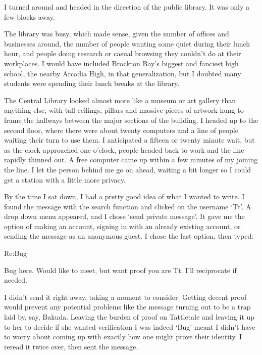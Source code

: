I turned around and headed in the direction of the public library.  It was only a few blocks away.



The library was busy, which made sense, given the number of offices and businesses around, the number of people wanting some quiet during their lunch hour, and people doing research or casual browsing they couldn't do at their workplaces.  I would have included Brockton Bay's biggest and fanciest high school, the nearby Arcadia High, in that generalization, but I doubted many students were spending their lunch breaks at the library.



The Central Library looked almost more like a museum or art gallery than anything else, with tall ceilings, pillars and massive pieces of artwork hung to frame the hallways between the major sections of the building.  I headed up to the second floor, where there were about twenty computers and a line of people waiting their turn to use them.  I anticipated a fifteen or twenty minute wait, but as the clock approached one o'clock, people headed back to work and the line rapidly thinned out.  A free computer came up within a few minutes of my joining the line. I let the person behind me go on ahead, waiting a bit longer so I could get a station with a little more privacy.



By the time I sat down, I had a pretty good idea of what I wanted to write.  I found the message with the search function and clicked on the username `Tt'.  A drop down menu appeared, and I chose `send private message'.  It gave me the option of making an account, signing in with an already existing account, or sending the message as an anonymous guest.  I chose the last option, then typed:



Re:Bug



Bug here.  Would like to meet, but want proof you are Tt.  I'll reciprocate if needed.



I didn't send it right away, taking a moment to consider.  Getting decent proof would prevent any potential problems like the message turning out to be a trap laid by, say, Bakuda.  Leaving the burden of proof on Tattletale and leaving it up to her to decide if she wanted verification I was indeed `Bug' meant I didn't have to worry about coming up with exactly how one might prove their identity.  I reread it twice over, then sent the message.



